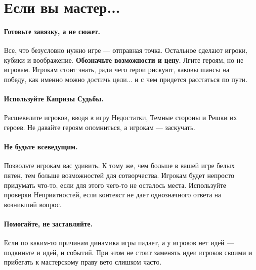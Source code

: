 \section*{Если вы мастер...}

\paragraph{Готовьте завязку, а не сюжет.} Все, что безусловно нужно игре — отправная точка. Остальное сделают игроки, кубики и воображение. \textbf{Обозначьте возможности и цену}. Лгите героям, но не игрокам. Игрокам стоит знать, ради чего герои рискуют, каковы шансы на победу, как именно можно достичь цели... и с чем придется расстаться по пути.
\paragraph{Используйте Капризы Судьбы.} Расшевелите игроков, вводя в игру Недостатки, Темные стороны и Решки их героев. Не давайте героям опомниться, а игрокам — заскучать.
\paragraph{Не будьте всеведущим.} Позвольте игрокам вас удивить. К тому же, чем больше в вашей игре белых пятен, тем больше возможностей для сотворчества. Игрокам будет непросто придумать что-то, если для этого чего-то не осталось места. Используйте проверки Неприятностей, если контекст не дает однозначного ответа на возникший вопрос.
\paragraph{Помогайте, не заставляйте.} Если по каким-то причинам динамика игры падает, а у игроков нет идей — подкиньте и идей, и событий. При этом не стоит заменять идеи игроков своими и прибегать к мастерскому праву вето слишком часто.